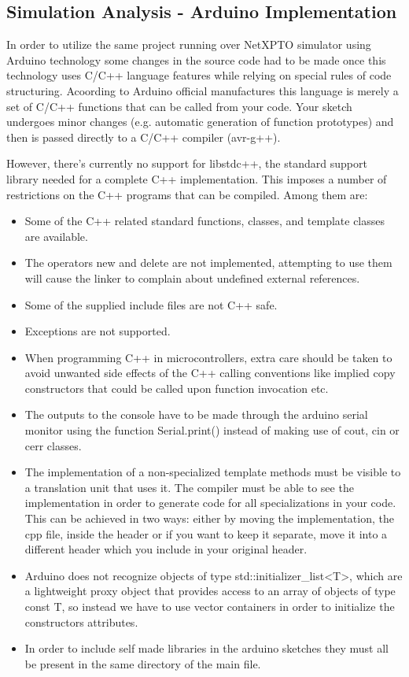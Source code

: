 \begin{refsection}
\begin{itemize}
\end{itemize}
	
	
	
	\subsection{Simulation Analysis - Arduino Implementation}
	
	In order to utilize the same project running over NetXPTO simulator using Arduino technology some changes in the source code had to be made once this technology uses C/C++ language features while relying on special rules of code structuring. Acoording to Arduino official manufactures this language is merely a set of C/C++ functions that can be called from your code. Your sketch undergoes minor changes (e.g. automatic generation of function prototypes) and then is passed directly to a C/C++ compiler (avr-g++). \par However, there's currently no support for libstdc++, the standard support library needed for a complete C++ implementation. This imposes a number of restrictions on the C++ programs that can be compiled. Among them are:
	
	\begin{itemize}
		\item Some of the C++ related standard functions, classes, and template classes are available.
		\item The operators new and delete are not implemented, attempting to use them will cause the linker to complain about undefined external references.
		\item Some of the supplied include files are not C++ safe.
		\item Exceptions are not supported.
		\item When programming C++ in microcontrollers, extra care should be taken to avoid unwanted side effects of the C++ calling conventions like implied copy constructors that could be called upon function invocation etc.
		\item The outputs to the console have to be made through the arduino serial monitor using the function Serial.print() instead of making use of cout, cin or cerr classes.
		\item  The implementation of a non-specialized template methods must be visible to a translation unit that uses it. The compiler must be able to see the implementation in order to generate code for all specializations in your code. This can be achieved in two ways: either by moving the implementation, the cpp file, inside the header or if you want to keep it separate, move it into a different header which you include in your original header.
		\item Arduino does not recognize objects of type std::initializer\_list<T>, which are a lightweight proxy object that provides access to an array of objects of type const T, so instead we have to use vector containers in order to initialize the constructors attributes.
		\item In order to include self made libraries in the arduino sketches they must all be present in the same directory of the main file.
		

\end{itemize}
\end{refsection}
